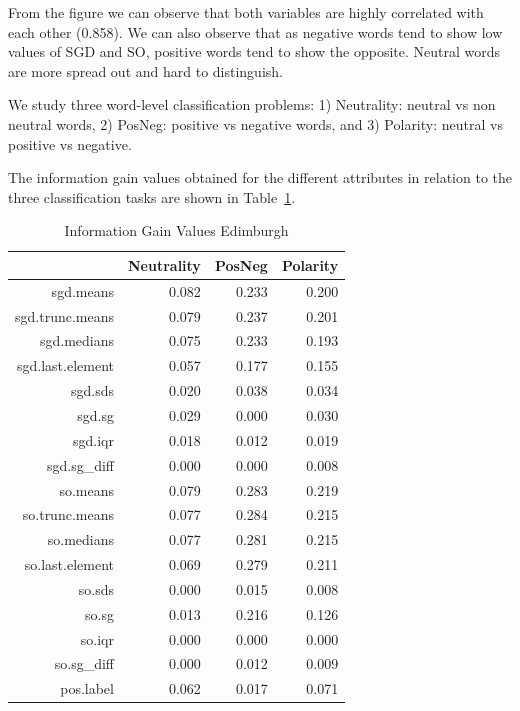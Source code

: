 \documentclass{sig-alternate}
\begin{document}
From the figure we can observe that both variables are highly correlated with each other (0.858). We can also observe that as negative words tend to show low values of SGD and SO, positive words tend to show the opposite. Neutral words are more spread out and hard to distinguish. 

We study three word-level classification problems: 1) Neutrality: neutral vs non neutral words, 2) PosNeg: positive vs negative words, and 3) Polarity: neutral vs positive vs negative.

The information gain values obtained for the different attributes in relation to the three classification tasks are shown in Table~\ref{tab:infogains}.
 
\begin{table}[ht]
\centering
\begin{tabular}{rrrr}
  \hline
 & Neutrality & PosNeg & Polarity \\ 
  \hline
sgd.means & 0.082 & 0.233 & 0.200 \\ 
  sgd.trunc.means & 0.079 & 0.237 & 0.201 \\ 
  sgd.medians & 0.075 & 0.233 & 0.193 \\ 
  sgd.last.element & 0.057 & 0.177 & 0.155 \\ 
  sgd.sds & 0.020 & 0.038 & 0.034 \\ 
  sgd.sg & 0.029 & 0.000 & 0.030 \\ 
  sgd.iqr & 0.018 & 0.012 & 0.019 \\ 
  sgd.sg\_diff & 0.000 & 0.000 & 0.008 \\ 
  so.means & 0.079 & 0.283 & 0.219 \\ 
  so.trunc.means & 0.077 & 0.284 & 0.215 \\ 
  so.medians & 0.077 & 0.281 & 0.215 \\ 
  so.last.element & 0.069 & 0.279 & 0.211 \\ 
  so.sds & 0.000 & 0.015 & 0.008 \\ 
  so.sg & 0.013 & 0.216 & 0.126 \\ 
  so.iqr & 0.000 & 0.000 & 0.000 \\ 
  so.sg\_diff & 0.000 & 0.012 & 0.009 \\ 
  pos.label & 0.062 & 0.017 & 0.071 \\ 
   \hline
\end{tabular}
\caption{Information Gain Values Edimburgh} 
\label{tab:infogains}
\end{table}
\end{document}
